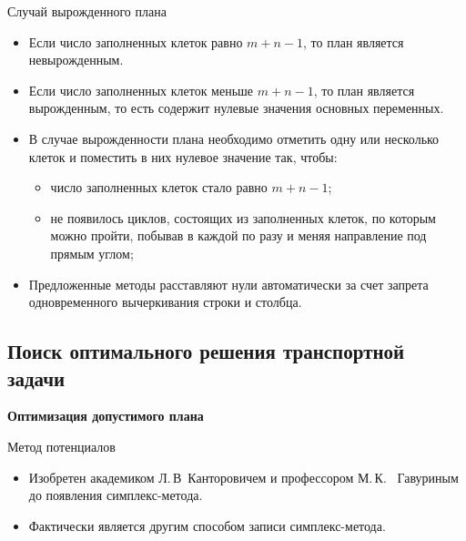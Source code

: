 \documentclass[unicode,11pt,notheorems,xcolor=table]{beamer}
\begin{document}
\begin{frame}{Случай вырожденного плана}
	\begin{itemize}
		\item 
		Если число заполненных клеток равно $m + n -1$, то план является невырожденным.     
		\item 
		Если число заполненных клеток меньше $m + n -1$, то план является вырожденным, то есть содержит нулевые значения основных переменных. 
		\item 
		В случае вырожденности плана необходимо отметить  одну или несколько клеток и поместить в них нулевое значение так, чтобы:
		\begin{itemize}
			\item число заполненных клеток стало равно $m+n-1$;
			\item не появилось циклов, состоящих из заполненных клеток, по которым можно пройти, побывав в каждой по разу и меняя направление под прямым углом;
		\end{itemize}
		\item 
		Предложенные методы расставляют нули автоматически за счет запрета одновременного вычеркивания строки и столбца.
	\end{itemize}
	
	
	
\end{frame}

\subsection{Поиск оптимального решения транспортной задачи}


\begin{frame}{}{}
	{\centering
		\LARGE
		\bfseries
		Оптимизация допустимого плана
		
		\bigskip
		Метод потенциалов
		\par}
	\begin{itemize}
		\item 
		Изобретен  академиком Л.\,В~Канторовичем и профессором М.\,К.~ Гавуриным до появления симплекс-метода.
		\item 
		Фактически является другим способом записи симплекс-метода.
	\end{itemize}
\end{frame}
\end{document}
